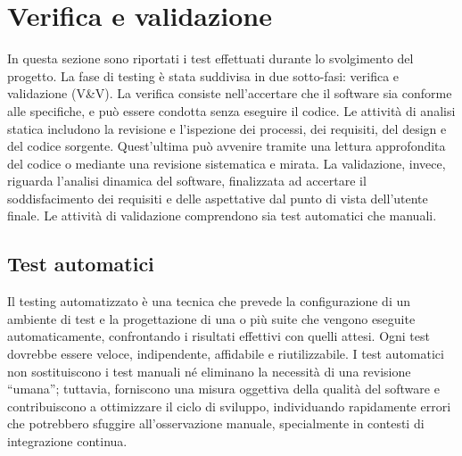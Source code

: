 \chapter{Verifica e validazione}
\label{cap:verifica-validazione}

\par In questa sezione sono riportati i test effettuati durante lo svolgimento del progetto. La fase di testing è stata suddivisa in due sotto-fasi: verifica e validazione (V\&V). La verifica consiste nell’accertare che il software sia conforme alle specifiche, e può essere condotta senza eseguire il codice. Le attività di analisi statica includono la revisione e l’ispezione dei processi, dei requisiti, del design e del codice sorgente. Quest’ultima può avvenire tramite una lettura approfondita del codice o mediante una revisione sistematica e mirata. La validazione, invece, riguarda l’analisi dinamica del software, finalizzata ad accertare il soddisfacimento dei requisiti e delle aspettative dal punto di vista dell’utente finale. Le attività di validazione comprendono sia test automatici che manuali.


\section{Test automatici}

\par Il testing automatizzato è una tecnica che prevede la configurazione di un ambiente di test e la progettazione di una o più suite che vengono eseguite automaticamente, confrontando i risultati effettivi con quelli attesi. Ogni test dovrebbe essere veloce, indipendente, affidabile e riutilizzabile. I test automatici non sostituiscono i test manuali né eliminano la necessità di una revisione “umana”; tuttavia, forniscono una misura oggettiva della qualità del software e contribuiscono a ottimizzare il ciclo di sviluppo, individuando rapidamente errori che potrebbero sfuggire all’osservazione manuale, specialmente in contesti di integrazione continua.

